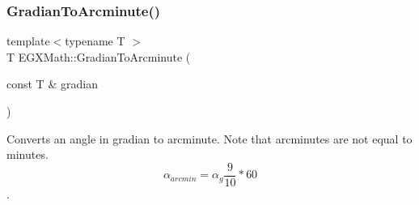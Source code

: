 \mbox{\label{group___e_g_x_math-_angle_conversions-_gradian_ga67ef7daad49b0d73c39c52d426ab46a5}} 
\subsubsection{\texorpdfstring{Gradian\+To\+Arcminute()}{GradianToArcminute()}}
{\footnotesize\ttfamily template$<$typename T $>$ \\
T E\+G\+X\+Math\+::\+Gradian\+To\+Arcminute (\begin{DoxyParamCaption}\item[{const T \&}]{gradian }\end{DoxyParamCaption})}



Converts an angle in gradian to arcminute. Note that arcminutes are not equal to minutes. \[\alpha_{arcmin}=\alpha_{g}\frac{9}{10} * 60\]. 

